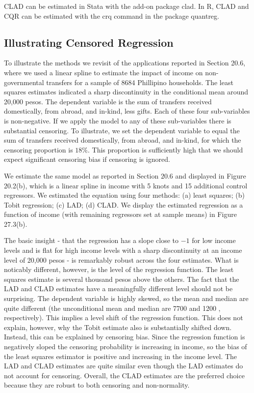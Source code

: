 \documentclass[10pt]{article}
\begin{document}
CLAD can be estimated in Stata with the add-on package clad. In R, CLAD and CQR can be estimated with the crq command in the package quantreg.

\subsection{Illustrating Censored Regression}
To illustrate the methods we revisit of the applications reported in Section 20.6, where we used a linear spline to estimate the impact of income on non-governmental transfers for a sample of 8684 Phillipino households. The least squares estimates indicated a sharp discontinuity in the conditional mean around 20,000 pesos. The dependent variable is the sum of transfers received domestically, from abroad, and in-kind, less gifts. Each of these four sub-variables is non-negative. If we apply the model to any of these sub-variables there is substantial censoring. To illustrate, we set the dependent variable to equal the sum of transfers received domestically, from abroad, and in-kind, for which the censoring proportion is $18 \%$. This proportion is sufficiently high that we should expect significant censoring bias if censoring is ignored.

We estimate the same model as reported in Section $20.6$ and displayed in Figure 20.2(b), which is a linear spline in income with 5 knots and 15 additional control regressors. We estimated the equation using four methods: (a) least squares; (b) Tobit regression; (c) LAD; (d) CLAD. We display the estimated regression as a function of income (with remaining regressors set at sample means) in Figure 27.3(b).

The basic insight - that the regression has a slope close to $-1$ for low income levels and is flat for high income levels with a sharp discontinuity at an income level of 20,000 pesos - is remarkably robust across the four estimates. What is noticably different, however, is the level of the regression function. The least squares estimate is several thousand pesos above the others. The fact that the LAD and CLAD estimates have a meaningfully different level should not be surprising. The dependent variable is highly skewed, so the mean and median are quite different (the unconditional mean and median are 7700 and 1200 , respectively). This implies a level shift of the regression function. This does not explain, however, why the Tobit estimate also is substantially shifted down. Instead, this can be explained by censoring bias. Since the regression function is negatively sloped the censoring probability is increasing in income, so the bias of the least squares estimator is positive and increasing in the income level. The LAD and CLAD estimates are quite similar even though the LAD estimates do not account for censoring. Overall, the CLAD estimates are the preferred choice because they are robust to both censoring and non-normality.
\end{document}
